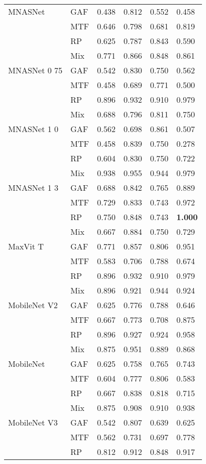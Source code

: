\begin{longtable}[t]{llllll}
MNASNet & GAF & 0.438 & 0.812 & 0.552 & 0.458 \\
 & MTF & 0.646 & 0.798 & 0.681 & 0.819 \\
 & RP & 0.625 & 0.787 & 0.843 & 0.590 \\
 & Mix & 0.771 & 0.866 & 0.848 & 0.861 \\
MNASNet 0 75 & GAF & 0.542 & 0.830 & 0.750 & 0.562 \\
 & MTF & 0.458 & 0.689 & 0.771 & 0.500 \\
 & RP & 0.896 & 0.932 & 0.910 & 0.979 \\
 & Mix & 0.688 & 0.796 & 0.811 & 0.750 \\
MNASNet 1 0 & GAF & 0.562 & 0.698 & 0.861 & 0.507 \\
 & MTF & 0.458 & 0.839 & 0.750 & 0.278 \\
 & RP & 0.604 & 0.830 & 0.750 & 0.722 \\
 & Mix & 0.938 & 0.955 & 0.944 & 0.979 \\
MNASNet 1 3 & GAF & 0.688 & 0.842 & 0.765 & 0.889 \\
 & MTF & 0.729 & 0.833 & 0.743 & 0.972 \\
 & RP & 0.750 & 0.848 & 0.743 & \textbf{1.000} \\
 & Mix & 0.667 & 0.884 & 0.750 & 0.729 \\
MaxVit T & GAF & 0.771 & 0.857 & 0.806 & 0.951 \\
 & MTF & 0.583 & 0.706 & 0.788 & 0.674 \\
 & RP & 0.896 & 0.932 & 0.910 & 0.979 \\
 & Mix & 0.896 & 0.921 & 0.944 & 0.924 \\
MobileNet V2 & GAF & 0.625 & 0.776 & 0.788 & 0.646 \\
 & MTF & 0.667 & 0.773 & 0.708 & 0.875 \\
 & RP & 0.896 & 0.927 & 0.924 & 0.958 \\
 & Mix & 0.875 & 0.951 & 0.889 & 0.868 \\
MobileNet & GAF & 0.625 & 0.758 & 0.765 & 0.743 \\
 & MTF & 0.604 & 0.777 & 0.806 & 0.583 \\
 & RP & 0.667 & 0.838 & 0.818 & 0.715 \\
 & Mix & 0.875 & 0.908 & 0.910 & 0.938 \\
MobileNet V3 & GAF & 0.542 & 0.807 & 0.639 & 0.625 \\
 & MTF & 0.562 & 0.731 & 0.697 & 0.778 \\
 & RP & 0.812 & 0.912 & 0.848 & 0.917 \\

\end{longtable}
